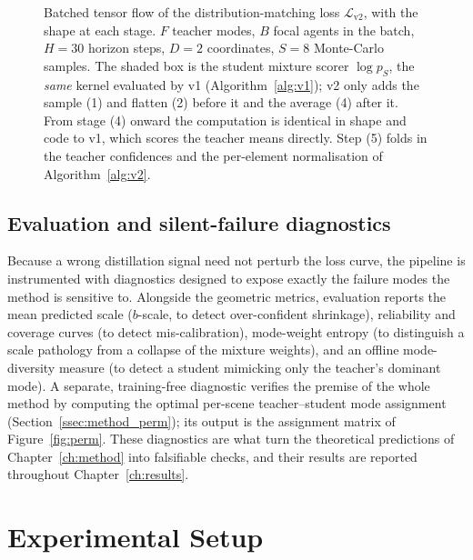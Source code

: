 \begin{figure}[htbp]
  \caption[Batched dataflow of the v2 distillation loss.]{Batched tensor flow of
    the distribution-matching loss $\mathcal{L}_{\mathrm{v2}}$, with the shape at
    each stage. $F$ teacher modes, $B$ focal agents in the batch, $H{=}30$ horizon
    steps, $D{=}2$ coordinates, $S{=}8$ Monte-Carlo samples. The shaded box is the
    student mixture scorer $\log p_S$, the \emph{same} kernel evaluated by v1
    (Algorithm~\ref{alg:v1}); v2 only adds the sample (1) and flatten (2) before it
    and the average (4) after it. From stage (4) onward the computation is identical
    in shape and code to v1, which scores the teacher means directly. Step (5)
    folds in the teacher confidences and the per-element normalisation of
    Algorithm~\ref{alg:v2}.}
  \label{fig:v2_pipeline}
\end{figure}

\subsection{Evaluation and silent-failure diagnostics}
\label{ssec:impl_diag}
Because a wrong distillation signal need not perturb the loss curve, the pipeline is
instrumented with diagnostics designed to expose exactly the failure modes the
method is sensitive to. Alongside the geometric metrics, evaluation reports the mean
predicted scale ($b$-scale, to detect over-confident shrinkage), reliability and
coverage curves (to detect mis-calibration), mode-weight entropy (to distinguish a
scale pathology from a collapse of the mixture weights), and an offline
mode-diversity measure (to detect a student mimicking only the teacher's dominant
mode). A separate, training-free diagnostic verifies the premise of the whole method
by computing the optimal per-scene teacher--student mode assignment
(Section~\ref{ssec:method_perm}); its output is the assignment matrix of
Figure~\ref{fig:perm}. These diagnostics are what turn the theoretical predictions
of Chapter~\ref{ch:method} into falsifiable checks, and their results are reported
throughout Chapter~\ref{ch:results}.

\section{Experimental Setup}
\label{sec:setup}

